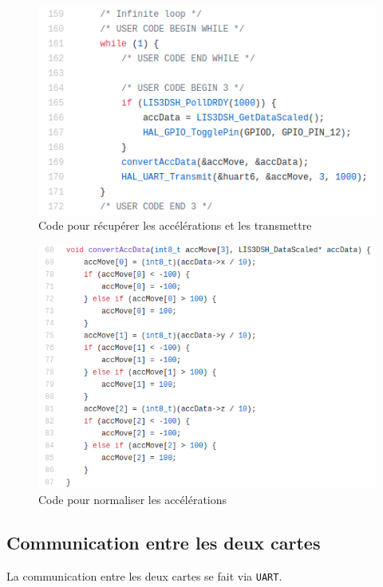 \documentclass[12pt,french]{article}
\begin{document}
\begin{figure}[h]
\centering
\includegraphics[width=\textwidth]{code_acc_while.png}
\caption{Code pour récupérer les accélérations et les transmettre}
\label{fig:accwhile}
\end{figure}

\begin{figure}[h]
\centering
\includegraphics[width=\textwidth]{code_acc_convert.png}
\caption{Code pour normaliser les accélérations}
\label{fig:accconvert}
\end{figure}

\subsection{Communication entre les deux cartes}

La communication entre les deux cartes se fait via \texttt{UART}.
\end{document}
